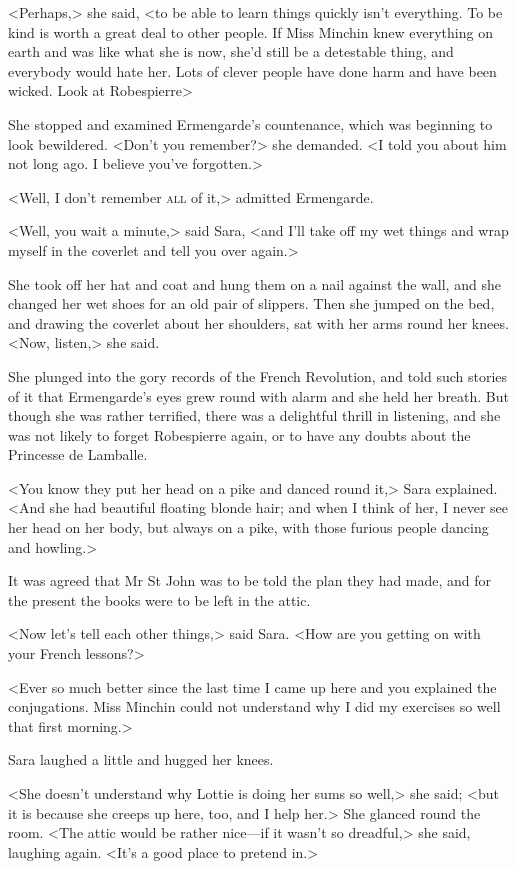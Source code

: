 <Perhaps,> she said, <to be able to learn things quickly isn't everything. To be kind is worth a great deal to other people. If Miss Minchin knew everything on earth and was like what she is now, she'd still be a detestable thing, and everybody would hate her. Lots of clever people have done harm and have been wicked. Look at Robespierre\longdash>

She stopped and examined Ermengarde's countenance, which was beginning to look bewildered. <Don't you remember?> she demanded. <I told you about him not long ago. I believe you've forgotten.>

<Well, I don't remember \textsc{all} of it,> admitted Ermengarde.

<Well, you wait a minute,> said Sara, <and I'll take off my wet things and wrap myself in the coverlet and tell you over again.>

She took off her hat and coat and hung them on a nail against the wall, and she changed her wet shoes for an old pair of slippers. Then she jumped on the bed, and drawing the coverlet about her shoulders, sat with her arms round her knees. <Now, listen,> she said.

She plunged into the gory records of the French Revolution, and told such stories of it that Ermengarde's eyes grew round with alarm and she held her breath. But though she was rather terrified, there was a delightful thrill in listening, and she was not likely to forget Robespierre again, or to have any doubts about the Princesse de Lamballe.

<You know they put her head on a pike and danced round it,> Sara explained. <And she had beautiful floating blonde hair; and when I think of her, I never see her head on her body, but always on a pike, with those furious people dancing and howling.>

It was agreed that Mr St John was to be told the plan they had made, and for the present the books were to be left in the attic.

<Now let's tell each other things,> said Sara. <How are you getting on with your French lessons?>

<Ever so much better since the last time I came up here and you explained the conjugations. Miss Minchin could not understand why I did my exercises so well that first morning.>

Sara laughed a little and hugged her knees.

<She doesn't understand why Lottie is doing her sums so well,> she said; <but it is because she creeps up here, too, and I help her.> She glanced round the room. <The attic would be rather nice—if it wasn't so dreadful,> she said, laughing again. <It's a good place to pretend in.>


